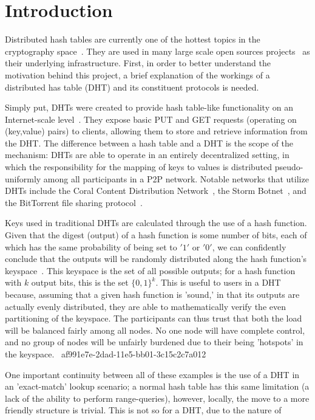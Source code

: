 \documentclass[12pt]{article}
\begin{document}
\section{Introduction}
\par Distributed hash tables are currently one of the hottest topics in the cryptography space~\cite{Stoica:2001dj,Rowstron:2001ea,Ratnasamy:2001wn}. They are used in many large scale open sources projects~\cite{Freitas:2013tb,Xu:2010vs,Perfitt:2010fh} as their underlying infrastructure. First, in order to better understand the motivation behind this project, a brief explanation of the workings of a distributed has table (DHT) and its constituent protocols is needed.

\par Simply put, DHTs were created to provide hash table-like functionality on an Internet-scale level~\cite{Ratnasamy:2001wn}. They expose basic PUT and GET requests (operating on (key,value) pairs) to clients, allowing them to store and retrieve information from the DHT. The difference between a hash table and a DHT is the scope of the mechanism: DHTs are able to operate in an entirely decentralized setting, in which the responsibility for the mapping of keys to values is distributed pseudo-uniformly among all participants in a P2P network. Notable networks that utilize DHTs include the Coral Content Distribution Network~\cite{Freedman:2004vb}, the Storm Botnet~\cite{Holz:2008uk}, and the BitTorrent file sharing protocol~\cite{Cohen:y1_8mBnw}.

\par Keys used in traditional DHTs are calculated through the use of a hash function. Given that the digest (output) of a hash function is some number of bits, each of which has the same probability of being set to $'1'$ or $'0'$, we can confidently conclude that the outputs will be randomly distributed along the hash function's keyspace~. This keyspace is the set of all possible outputs; for a hash function with $k$ output bits, this is the set $\{0,1\}^k$. This is useful to users in a DHT because, assuming that a given hash function is 'sound,' in that its outputs are actually evenly distributed, they are able to mathematically verify the even partitioning of the keyspace. The participants can thus trust that both the load will be balanced fairly among all nodes. No one node will have complete control, and no group of nodes will be unfairly burdened due to their being 'hotspots' in the keyspace.~
af991e7e-2dad-11e5-bb01-3c15c2c7a012
\par One important continuity between all of these examples is the use of a DHT in an 'exact-match' lookup scenario; a normal hash table has this same limitation (a lack of the ability to perform range-queries), however, locally, the move to a more friendly structure is trivial. This is not so for a DHT, due to the nature of
\printbibliography
\end{document}
